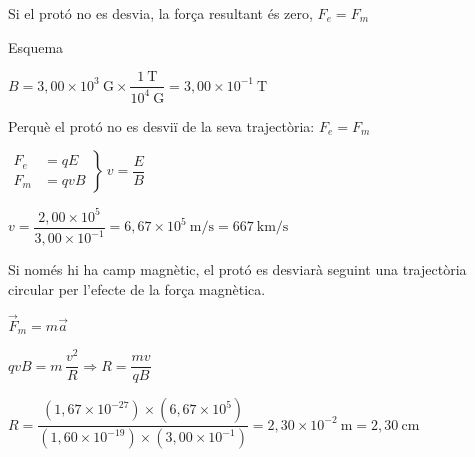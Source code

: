 \begin{solapartat}
Si el protó no es desvia, la força resultant és zero, $F_e = F_m$

 Esquema


$B = 3,00\times 10^{3}\ \mathrm{G}\times\dfrac{1\ \mathrm{T}}{10^{4}\ \mathrm{G}} = 3,00\times 10^{-1}\ \mathrm{T}$

 Perquè el protó no es desviï de la seva trajectòria: $F_e = F_m$

 $\left.\begin{aligned} F_e &= qE\\ F_m &= qvB\end{aligned}\right\}\ v = \dfrac{E}{B}$

 $v = \dfrac{2,00\times 10^{5}}{3,00\times 10^{-1}} = 6,67\times 10^{5}\ \mathrm{m/s} = 667\ \mathrm{km/s}$
\end{solapartat}

\begin{solapartat}
Si només hi ha camp magnètic, el protó es desviarà seguint una trajectòria circular per l'efecte de la força magnètica.

 $\vec{F}_m = m\vec{a}$

 $qvB = m\,\dfrac{v^2}{R} \Rightarrow R = \dfrac{mv}{qB}$

 $R = \dfrac{(1,67\times 10^{-27})\times(6,67\times 10^{5})}{(1,60\times 10^{-19})\times(3,00\times 10^{-1})} = 2,30\times 10^{-2}\ \mathrm{m} = 2,30\ \mathrm{cm}$
\end{solapartat}
